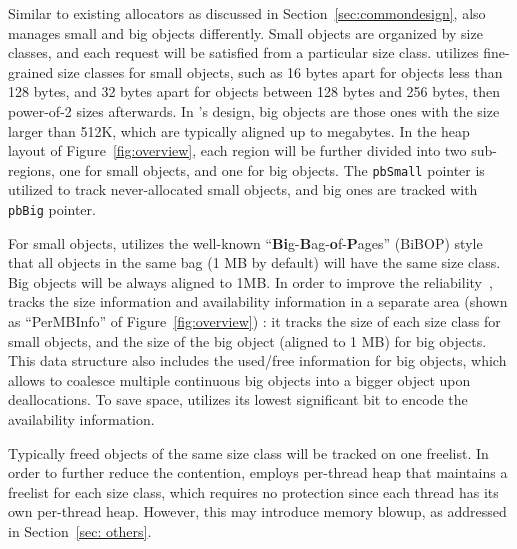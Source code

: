 
Similar to existing allocators as discussed in Section~\ref{sec:commondesign}, \NM{} also manages small and big objects differently. Small objects are organized by size classes, and each request will be satisfied from a particular size class. \NA{} utilizes fine-grained size classes for small objects, such as 16 bytes apart for objects less than 128 bytes, and 32 bytes apart for objects between 128 bytes and 256 bytes, then power-of-2 sizes afterwards. In \NM{}'s design, big objects are those ones with the size larger than 512K, which are typically aligned up to megabytes. In the heap layout of Figure~\ref{fig:overview}, each region will be further divided into two sub-regions, one for small objects, and one for big objects. The \texttt{pbSmall} pointer is utilized to track never-allocated small objects, and big ones are tracked with \texttt{pbBig} pointer. 

For small objects, \NM{} utilizes the well-known  ``\textbf{Bi}g-\textbf{B}ag-\textbf{o}f-\textbf{P}ages'' (BiBOP) style that all objects in the same bag (1 MB by default) will have the same size class. Big objects will be always aligned to 1MB. In order to improve the reliability~\citep{FreeGuard, Guarder}, \NM{} tracks the size information and availability information in a separate area (shown as ``PerMBInfo'' of Figure~\ref{fig:overview}) : it tracks the size of each size class for small objects, and the size of the big object (aligned to 1 MB) for big objects. This data structure also includes the used/free information for big objects, which allows to coalesce multiple continuous big objects into a bigger object upon deallocations. To save space, \NM{} utilizes its lowest significant bit to encode the availability information.

Typically freed objects of the same size class will be tracked on one freelist. In order to further reduce the contention, \NM{} employs per-thread heap that maintains a freelist for each size class, which requires no protection since each thread has its own per-thread heap. However, this may introduce memory blowup, as addressed in Section~\ref{sec: others}. 

